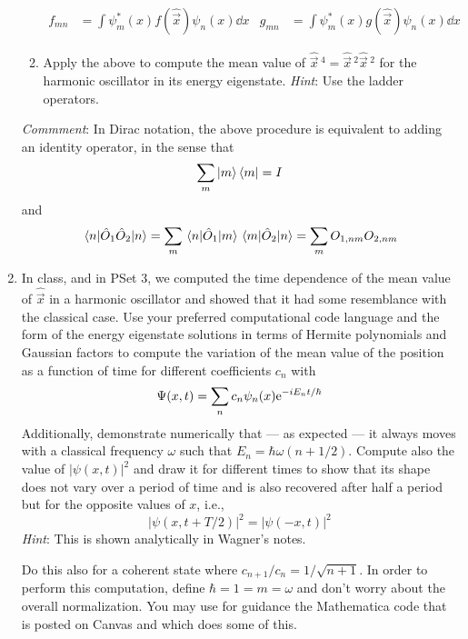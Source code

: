 \documentclass[../psets.tex]{subfiles}
\begin{document}
\begin{enumerate}
\begin{enumerate}
        \begin{align}
            f_{mn} &= \int\psi_m^*(x)f(\hat{\vec{x}})\psi_n(x)\dd{x}&
            g_{mn} &= \int\psi_m^*(x)g(\hat{\vec{x}})\psi_n(x)\dd{x}
        \end{align}
        \item Apply the above to compute the mean value of $\hat{\vec{x}}{\,}^4=\hat{\vec{x}}{\,}^2\hat{\vec{x}}{\,}^2$ for the harmonic oscillator in its energy eigenstate. \emph{Hint}: Use the ladder operators.
    \end{enumerate}
    \emph{Commment}: In Dirac notation, the above procedure is equivalent to adding an identity operator, in the sense that
    \begin{equation}
        \sum_m\ket{m}\bra{m} = I
    \end{equation}
    and
    \begin{equation}
        \ev{\hat{O}_1\hat{O}_2}{n} = \sum_m\mel{n}{\hat{O}_1}{m}\mel{m}{\hat{O}_2}{n}
        = \sum_mO_{1,nm}O_{2,nm}
    \end{equation}
    \item In class, and in PSet 3, we computed the time dependence of the mean value of $\hat{\vec{x}}$ in a harmonic oscillator and showed that it had some resemblance with the classical case. Use your preferred computational code language and the form of the energy eigenstate solutions in terms of Hermite polynomials and Gaussian factors to compute the variation of the mean value of the position as a function of time for different coefficients $c_n$ with
    \begin{equation*}
        \Psi(x,t) = \sum_nc_n\psi_n(x)\e[-iE_nt/\hbar]
    \end{equation*}
    Additionally, demonstrate numerically that --- as expected --- it always moves with a classical frequency $\omega$ such that $E_n=\hbar\omega(n+1/2)$. Compute also the value of $|\psi(x,t)|^2$ and draw it for different times to show that its shape does not vary over a period of time and is also recovered after half a period but for the opposite values of $x$, i.e.,
    \begin{equation*}
        |\psi(x,t+T/2)|^2 = |\psi(-x,t)|^2
    \end{equation*}
    \emph{Hint}: This is shown analytically in Wagner's notes.\par
    Do this also for a coherent state where $c_{n+1}/c_n=1/\sqrt{n+1}$. In order to perform this computation, define $\hbar=1=m=\omega$ and don't worry about the overall normalization. You may use for guidance the Mathematica code that is posted on Canvas and which does some of this.
\end{enumerate}
\end{document}
